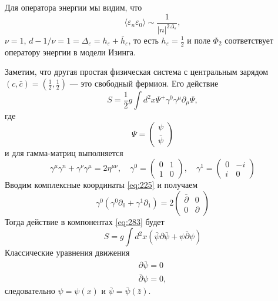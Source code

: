 \documentclass[a4paper,12pt]{article}
\theoremstyle{definition}
\theoremstyle{definition}
\theoremstyle{definition}
\begin{document}
Для оператора энергии мы видим, что
\begin{equation}
  \label{eq:281}
  \langle\varepsilon_{n}\varepsilon_{0}\rangle\sim \frac{1}{|n|^{2\Delta_{\varepsilon}}},
\end{equation}
$\nu=1$, $d-1/\nu=1=\Delta_{\varepsilon}=h_{\varepsilon}+\bar h_{\varepsilon}$, то есть $h_{\varepsilon}=\frac{1}{2}$ и поле $\Phi_{2}$ соответствует оператору энергии в модели Изинга.

Заметим, что другая простая физическая система с центральным зарядом $(c,\bar c)=\left(\frac{1}{2},\frac{1}{2}\right)$ --- это свободный фермион. Его действие
\begin{equation}
  \label{eq:282}
  S=\frac{1}{2} g \int d^{2}x\Psi^{+}\gamma^{0}\gamma^{\mu}\partial_{\mu}\Psi,
\end{equation}
где
\begin{equation}
  \label{eq:283}
  \Psi=
  \begin{pmatrix}
    \psi\\ \bar \psi
  \end{pmatrix}
\end{equation}
и для гамма-матриц выполняется
\begin{equation}
  \label{eq:284}
  \gamma^{\mu}\gamma^{n}+\gamma^{\nu}\gamma^{\mu}=2\eta^{\mu\nu},\quad \gamma^{0}=
  \begin{pmatrix}
    0 & 1\\
    1 & 0
  \end{pmatrix}, \quad
  \gamma^{1}=
  \begin{pmatrix}
    0 & -i\\
    i & 0
  \end{pmatrix}
\end{equation}
Вводим комплексные координаты \eqref{eq:225} и получаем
\begin{equation}
  \label{eq:285}
  \gamma^{0}(\gamma^{0}\partial_{0}+\gamma^{1}\partial_{1})=2
  \begin{pmatrix}
    \bar \partial & 0\\
    0 & \partial
  \end{pmatrix}
\end{equation}
Тогда действие в компонентах \eqref{eq:283} будет
\begin{equation}
  \label{eq:286}
  S=g\int d^{2}x (\bar \psi \partial \bar \psi + \psi\bar \partial \psi)
\end{equation}
Классические уравнения движения
\begin{eqnarray}
  \label{eq:287}
  \partial \bar \psi=0\\
  \bar \partial \psi=0, 
\end{eqnarray}
следовательно $\psi=\psi(x)$ и $\bar \psi=\bar \psi(\bar z)$. 
{}

\end{document}
